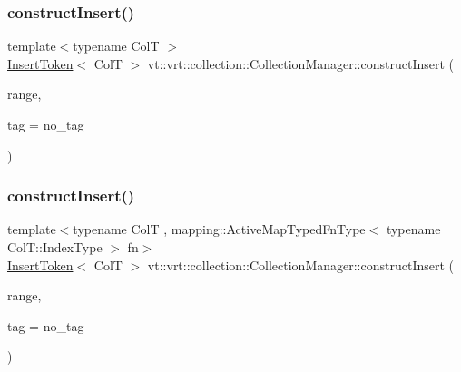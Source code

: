 \mbox{\label{structvt_1_1vrt_1_1collection_1_1_collection_manager_a0e15cc861c0d979d8977b226efd7c271}} 
\subsubsection{\texorpdfstring{construct\+Insert()}{constructInsert()}\hspace{0.1cm}{\footnotesize\ttfamily [1/2]}}
{\footnotesize\ttfamily template$<$typename ColT $>$ \\
\hyperlink{structvt_1_1vrt_1_1collection_1_1_insert_token}{Insert\+Token}$<$ ColT $>$ vt\+::vrt\+::collection\+::\+Collection\+Manager\+::construct\+Insert (\begin{DoxyParamCaption}\item[{typename Col\+T\+::\+Index\+Type}]{range,  }\item[{\hyperlink{namespacevt_a84ab281dae04a52a4b243d6bf62d0e52}{Tag\+Type} const \&}]{tag = {\ttfamily no\+\_\+tag} }\end{DoxyParamCaption})}

\mbox{\label{structvt_1_1vrt_1_1collection_1_1_collection_manager_a51e938c8c05bf9a39ab69532ea12336d}} 
\subsubsection{\texorpdfstring{construct\+Insert()}{constructInsert()}\hspace{0.1cm}{\footnotesize\ttfamily [2/2]}}
{\footnotesize\ttfamily template$<$typename ColT , mapping\+::\+Active\+Map\+Typed\+Fn\+Type$<$ typename Col\+T\+::\+Index\+Type $>$ fn$>$ \\
\hyperlink{structvt_1_1vrt_1_1collection_1_1_insert_token}{Insert\+Token}$<$ ColT $>$ vt\+::vrt\+::collection\+::\+Collection\+Manager\+::construct\+Insert (\begin{DoxyParamCaption}\item[{typename Col\+T\+::\+Index\+Type}]{range,  }\item[{\hyperlink{namespacevt_a84ab281dae04a52a4b243d6bf62d0e52}{Tag\+Type} const \&}]{tag = {\ttfamily no\+\_\+tag} }\end{DoxyParamCaption})}

